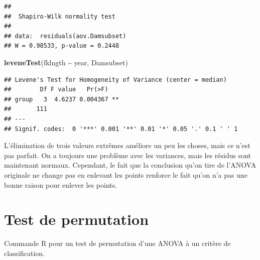 \documentclass[
  12pt,
]{book}
\newenvironment{Shaded}{\begin{snugshade}}{\end{snugshade}}
\newcommand{\KeywordTok}[1]{\textcolor[rgb]{0.13,0.29,0.53}{\textbf{#1}}}
\newcommand{\NormalTok}[1]{#1}
\newcommand{\OperatorTok}[1]{\textcolor[rgb]{0.81,0.36,0.00}{\textbf{#1}}}
\newcommand{\StringTok}[1]{\textcolor[rgb]{0.31,0.60,0.02}{#1}}
\begin{document}
\begin{verbatim}
## 
##  Shapiro-Wilk normality test
## 
## data:  residuals(aov.Damsubset)
## W = 0.98533, p-value = 0.2448
\end{verbatim}

\begin{Shaded}
\begin{Highlighting}[]
\KeywordTok{leveneTest}\NormalTok{(fklngth }\OperatorTok{\textasciitilde{}}\StringTok{ }\NormalTok{year, Damsubset)}
\end{Highlighting}
\end{Shaded}

\begin{verbatim}
## Levene's Test for Homogeneity of Variance (center = median)
##        Df F value   Pr(>F)   
## group   3  4.6237 0.004367 **
##       111                    
## ---
## Signif. codes:  0 '***' 0.001 '**' 0.01 '*' 0.05 '.' 0.1 ' ' 1
\end{verbatim}

L'élimination de trois valeurs extrêmes améliore un peu les choses, mais ce n'est pas parfait. On a toujours une problème avec les variances, mais les résidus sont maintenant normaux. Cependant, le fait que la conclusion qu'on tire de l'ANOVA originale ne change pas en enlevant les points renforce le fait qu'on n'a pas une bonne raison pour enlever les points.

\hypertarget{test-de-permutation}{%
\section{Test de permutation}\label{test-de-permutation}}

Commande R pour un test de permutation d'une ANOVA à un critère de classification.
\end{document}
